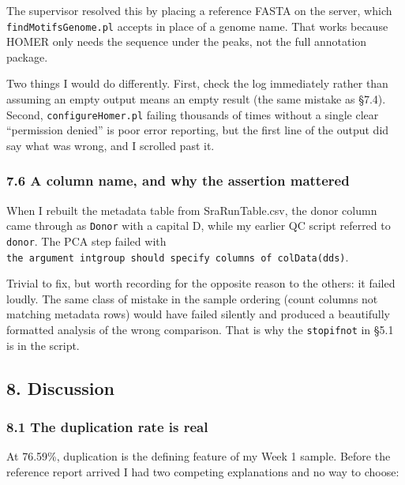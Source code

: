 \documentclass[
  11pt,
  a4paper,
]{article}
\begin{document}
The supervisor resolved this by placing a reference FASTA on the server,
which \texttt{findMotifsGenome.pl} accepts in place of a genome name.
That works because HOMER only needs the sequence under the peaks, not
the full annotation package.

Two things I would do differently. First, check the log immediately
rather than assuming an empty output means an empty result (the same
mistake as §7.4). Second, \texttt{configureHomer.pl} failing thousands
of times without a single clear ``permission denied'' is poor error
reporting, but the first line of the output did say what was wrong, and
I scrolled past it.

\hypertarget{a-column-name-and-why-the-assertion-mattered}{%
\subsubsection{7.6 A column name, and why the assertion
mattered}\label{a-column-name-and-why-the-assertion-mattered}}

When I rebuilt the metadata table from SraRunTable.csv, the donor column
came through as \texttt{Donor} with a capital D, while my earlier QC
script referred to \texttt{donor}. The PCA step failed with
\texttt{the\ argument\ \textquotesingle{}intgroup\textquotesingle{}\ should\ specify\ columns\ of\ colData(dds)}.

Trivial to fix, but worth recording for the opposite reason to the
others: it failed loudly. The same class of mistake in the sample
ordering (count columns not matching metadata rows) would have failed
silently and produced a beautifully formatted analysis of the wrong
comparison. That is why the \texttt{stopifnot} in §5.1 is in the script.

\hypertarget{discussion}{%
\subsection{8. Discussion}\label{discussion}}

\hypertarget{the-duplication-rate-is-real}{%
\subsubsection{8.1 The duplication rate is
real}\label{the-duplication-rate-is-real}}

At 76.59\%, duplication is the defining feature of my Week 1 sample.
Before the reference report arrived I had two competing explanations and
no way to choose:
\end{document}
